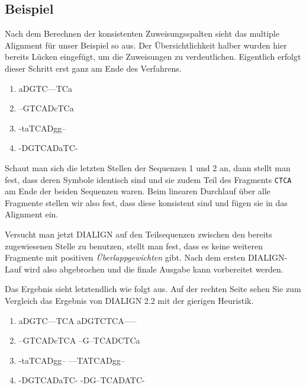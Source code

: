 \subsection{Beispiel}

Nach dem Berechnen der konsistenten Zuweisungsspalten sieht das multiple Alignment für unser Beispiel so aus. Der Übersichtlichkeit halber wurden hier bereits Lücken eingefügt, um die Zuweisungen zu verdeutlichen. Eigentlich erfolgt dieser Schritt erst ganz am Ende des Verfahrens.

\ttfamily
\begin{enumerate}[topsep=0pt,itemsep=-1ex,partopsep=1ex,parsep=1ex]
	\item aDGTC---TCa
	\item --GTCADcTCa
	\item -taTCADgg--
	\item -DGTCADaTC-
\end{enumerate}
\normalfont

Schaut man sich die letzten Stellen der Sequenzen 1 und 2 an, dann stellt man fest, dass deren Symbole identisch sind und sie zudem Teil des Fragments \texttt{CTCA} am Ende der beiden Sequenzen waren. Beim linearen Durchlauf über alle Fragmente stellen wir also fest, dass diese konsistent sind und fügen sie in das Alignment ein.

Versucht man jetzt DIALIGN auf den Teilsequenzen zwischen den bereits zugewiesenen Stelle zu benutzen, stellt man fest, dass es keine weiteren Fragmente mit positiven \emph{Überlappgewichten} gibt. Nach dem ersten DIALIGN-Lauf wird also abgebrochen und die finale Ausgabe kann vorbereitet werden.

Das Ergebnis sieht letztendlich wie folgt aus. Auf der rechten Seite sehen Sie zum Vergleich das Ergebnis von DIALIGN 2.2 mit der gierigen Heuristik.

\ttfamily
\begin{enumerate}[topsep=0pt,itemsep=-1ex,partopsep=1ex,parsep=1ex]
	\item aDGTC---TCA \hspace{3cm} aDGTCTCA-----
	\item --GTCADcTCA \hspace{3cm} --G--TCADCTCa
	\item -taTCADgg-- \hspace{3cm} ---TATCADgg--
	\item -DGTCADaTC- \hspace{3cm} -DG--TCADATC-
\end{enumerate}
\normalfont

